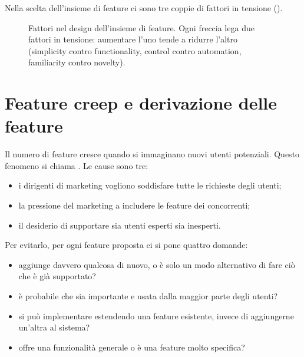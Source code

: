 Nella scelta dell'insieme di feature ci sono tre coppie di fattori in tensione ().

\begin{figure}[ht]
\centering
{}
\caption{Fattori nel design dell'insieme di feature. Ogni freccia lega due fattori in tensione: aumentare l'uno
tende a ridurre l'altro (simplicity contro functionality, control contro automation, familiarity contro novelty).}
\label{fig:feature-fattori}
\end{figure}

\section{Feature creep e derivazione delle feature}
\label{sec:feature-creep}

Il numero di feature cresce quando si immaginano nuovi utenti potenziali. Questo fenomeno si chiama
. Le cause sono tre:
\begin{itemize}
  \item i dirigenti di marketing vogliono soddisfare tutte le richieste degli utenti;
  \item la pressione del marketing a includere le feature dei concorrenti;
  \item il desiderio di supportare sia utenti esperti sia inesperti.
\end{itemize}

Per evitarlo, per ogni feature proposta ci si pone quattro domande:
\begin{itemize}
  \item aggiunge davvero qualcosa di nuovo, o è solo un modo alternativo di fare ciò che è già supportato?
  \item è probabile che sia importante e usata dalla maggior parte degli utenti?
  \item si può implementare estendendo una feature esistente, invece di aggiungerne un'altra al sistema?
  \item offre una funzionalità generale o è una feature molto specifica?
\end{itemize}


